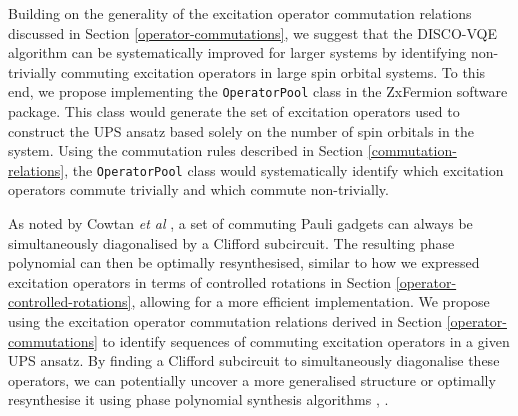 Building on the generality of the excitation operator commutation relations discussed in Section \ref{operator-commutations}, we suggest that the DISCO-VQE algorithm can be systematically improved for larger systems by identifying non-trivially commuting excitation operators in large spin orbital systems. To this end, we propose implementing the \lstinline{OperatorPool} class in the ZxFermion software package. This class would generate the set of excitation operators used to construct the UPS ansatz based solely on the number of spin orbitals in the system. Using the commutation rules described in Section \ref{commutation-relations}, the \lstinline{OperatorPool} class would systematically identify which excitation operators commute trivially and which commute non-trivially.

As noted by Cowtan \textit{et al} \cite{Cowtan2020}, a set of commuting Pauli gadgets can always be simultaneously diagonalised by a Clifford subcircuit. The resulting phase polynomial can then be optimally resynthesised, similar to how we expressed excitation operators in terms of controlled rotations in Section \ref{operator-controlled-rotations}, allowing for a more efficient implementation. We propose using the excitation operator commutation relations derived in Section \ref{operator-commutations} to identify sequences of commuting excitation operators in a given UPS ansatz. By finding a Clifford subcircuit to simultaneously diagonalise these operators, we can potentially uncover a more generalised structure or optimally resynthesise it using phase polynomial synthesis algorithms \cite{Amy2013}, \cite{Amy2014}.
